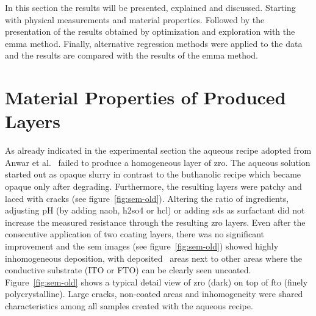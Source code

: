 In this section the results will be presented, explained and discussed.
Starting with physical measurements and material properties.
Followed by the presentation of the results obtained by optimization and exploration with the \gls{emma} method. 
Finally, alternative regression methods were applied to the data and the results are compared with the results of the \gls{emma} method. 

\section{Material Properties of Produced Layers}
\label{sec:res-mat}
As already indicated in the experimental section the aqueous recipe adopted from Anwar et al.~\cite{Anwar2017} failed to produce a homogeneous layer of \gls{zro}.
The aqueous solution started out as opaque slurry in contrast to the buthanolic recipe which became opaque only after degrading. 
Furthermore, the resulting layers were patchy and laced with cracks (see figure~\ref{fig:sem-old}). 
Altering the ratio of ingredients, adjusting pH (by adding \gls{naoh}, \gls{h2so4} or \gls{hcl}) or adding \gls{sds} as surfactant did not increase the measured resistance through the resulting \gls{zro} layers. 
Even after the consecutive application of two coating layers, 
there was no significant improvement and the \gls{sem} images (see figure~\ref{fig:sem-old}) 
showed highly inhomogeneous deposition, with deposited  areas next to other areas where the conductive substrate (ITO or FTO) can be clearly seen  uncoated.
%
Figure~\ref{fig:sem-old} shows a typical detail view of \gls{zro} (dark) on top of \gls{fto} (finely polycrystalline). 
Large cracks, non-coated areas and inhomogeneity were 
shared characteristics among 
all samples created with the aqueous recipe. 

